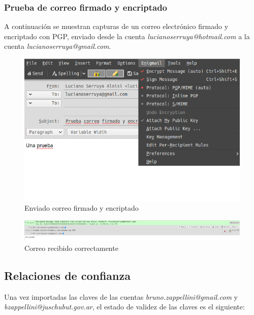 \subsubsection{Prueba de correo firmado y encriptado}

A continuación se muestran capturas de un correo electrónico firmado y encriptado con PGP, enviado desde la cuenta \emph{lucianoserruya@hotmail.com} a la cuenta \emph{lucianoserruya@gmail.com}.

\begin{figure}[H]
    \centering
    \includegraphics[width=\linewidth]{images/arys-tp3-correo-firmado-encriptado-pgp.png}
    \caption*{Enviado correo firmado y encriptado}
\end{figure}

\begin{figure}[H]
    \centering
    \includegraphics[width=\linewidth]{images/arys-tp3-correo-recibido-firmado-encriptado-pgp.png}
    \caption*{Correo recibido correctamente}
\end{figure}


\subsection{Relaciones de confianza}

Una vez importadas las claves de las cuentas \emph{bruno.zappellini@gmail.com} y \emph{bzappellini@juschubut.gov.ar}, el estado de validez de las claves es el siguiente:

